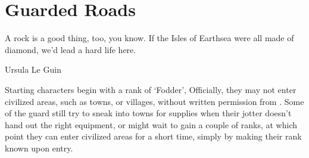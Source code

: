 \chapter{Guarded Roads}
\epigraph{A rock is a good thing, too, you know. If the Isles of Earthsea were all made of diamond, we'd lead a hard life here.}{Ursula Le Guin}
\label{roadsChapter}

\noindent
Starting characters begin with a rank of `Fodder',%
Officially, they may not enter civilized areas, such as towns, or \glspl{village}, without written permission from .
Some of the \gls{guard} still try to sneak into towns for supplies when their \gls{jotter} doesn't hand out the right equipment, or might wait to gain a couple of ranks, at which point they can enter civilized areas for a short time, simply by making their rank known upon entry.

